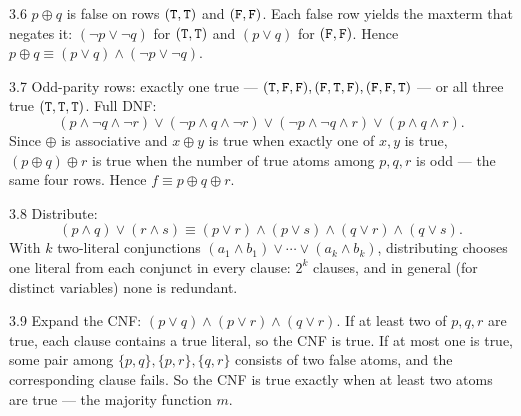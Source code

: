 \begin{solution}{3.6}
$p \oplus q$ is false on rows $(\mathtt{T},\mathtt{T})$ and $(\mathtt{F},\mathtt{F})$. Each false row
yields the maxterm that negates it:
$(\neg p \vee \neg q)$ for $(\mathtt{T},\mathtt{T})$ and $(p \vee q)$ for $(\mathtt{F},\mathtt{F})$.
Hence $p \oplus q \equiv (p \vee q) \wedge (\neg p \vee \neg q)$.
\end{solution}

\begin{solution}{3.7}
Odd-parity rows: exactly one true ---
$(\mathtt{T},\mathtt{F},\mathtt{F}), (\mathtt{F},\mathtt{T},\mathtt{F}), (\mathtt{F},\mathtt{F},\mathtt{T})$ --- or all three true
$(\mathtt{T},\mathtt{T},\mathtt{T})$. Full DNF:
\[
(p\wedge\neg q\wedge\neg r) \vee (\neg p\wedge q\wedge\neg r) \vee
(\neg p\wedge\neg q\wedge r) \vee (p\wedge q\wedge r).
\]
Since $\oplus$ is associative and $x \oplus y$ is true when exactly one of
$x,y$ is true, $(p \oplus q) \oplus r$ is true when the number of true atoms
among $p,q,r$ is odd --- the same four rows. Hence
$f \equiv p \oplus q \oplus r$.
\end{solution}

\begin{solution}{3.8}
Distribute:
\[
(p \wedge q) \vee (r \wedge s)
\equiv (p \vee r) \wedge (p \vee s) \wedge (q \vee r) \wedge (q \vee s).
\]
With $k$ two-literal conjunctions $(a_1\wedge b_1)\vee\cdots\vee(a_k\wedge b_k)$,
distributing chooses one literal from each conjunct in every clause: $2^k$
clauses, and in general (for distinct variables) none is redundant.
\end{solution}

\begin{solution}{3.9}
Expand the CNF:
$(p \vee q) \wedge (p \vee r) \wedge (q \vee r)$. If at least two of $p,q,r$
are true, each clause contains a true literal, so the CNF is true. If at most
one is true, some pair among $\{p,q\},\{p,r\},\{q,r\}$ consists of two false
atoms, and the corresponding clause fails. So the CNF is true exactly when at
least two atoms are true --- the majority function $m$.
\end{solution}
